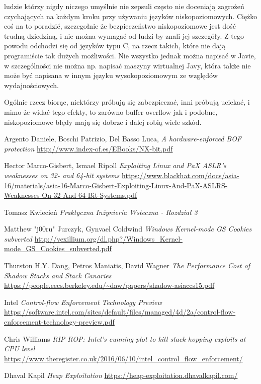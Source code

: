 \documentclass[polish]{kbk}
\begin{document}
ludzie którzy nigdy niczego umyślnie nie zepsuli często nie doceniają zagrożeń 
czychających na każdym kroku przy używaniu języków niskopoziomowych. Ciężko 
coś na to poradzić, szczegołnie że bezpieczeństwo niskopoziomowe jest dość 
trudną dziedziną, i nie można wymagać od ludzi by znali jej szczegóły. 
Z tego powodu odchodzi się od języków typu C, na rzecz takich, które nie dają 
programiście tak dużych możliwości. Nie wszystko jednak można napisać w Javie, 
w szczególności nie można np. napisać maszyny wirtualnej Javy, która także 
nie może być napisana w innym języku wysokopoziomowym ze względów wydajnościowych.
\par
Ogólnie rzecz biorąc, niektórzy próbują się zabezpieczać, inni próbują uciekać, 
i mimo że widać tego efekty, to zarówno buffer overflow jak i podobne, 
niskopoziomowe błędy mają się dobrze i dalej robią wiele szkód.

\begin{thebibliography}{99}
 Argento Daniele, Boschi Patrizio, Del Basso Luca, 
\textit{A hardware-enforced BOF protection}
\url{http://www.index-of.es/EBooks/NX-bit.pdf}

 Hector Marco-Gisbert, Ismael Ripoll 
\textit{Exploiting Linux and PaX ASLR’s weaknesses on 32- and 64-bit systems}
\url{https://www.blackhat.com/docs/asia-16/materials/asia-16-Marco-Gisbert-Exploiting-Linux-And-PaX-ASLRS-Weaknesses-On-32-And-64-Bit-Systems.pdf}

 Tomasz Kwiecień
\textit{Praktyczna Inżynieria Wsteczna - Rozdział 3}

 Matthew "j00ru" Jurczyk, Gynvael Coldwind
\textit{Windows Kernel-mode GS Cookies subverted}
\url{http://vexillium.org/dl.php?/Windows_Kernel-mode_GS_Cookies_subverted.pdf}

 Thurston H.Y. Dang, Petros Maniatis, David Wagner 
\textit{The Performance Cost of Shadow Stacks and Stack Canaries}
\url{https://people.eecs.berkeley.edu/~daw/papers/shadow-asiaccs15.pdf}

 Intel 
\textit{Control-flow Enforcement Technology Preview}
\url{https://software.intel.com/sites/default/files/managed/4d/2a/control-flow-enforcement-technology-preview.pdf}

  Chris Williams 
\textit{RIP ROP: Intel's cunning plot to kill stack-hopping exploits at CPU level}
\url{https://www.theregister.co.uk/2016/06/10/intel_control_flow_enforcement/}

  Dhaval Kapil
\textit{Heap Exploitation}
\url{https://heap-exploitation.dhavalkapil.com/}
\end{thebibliography}
\end{document}
